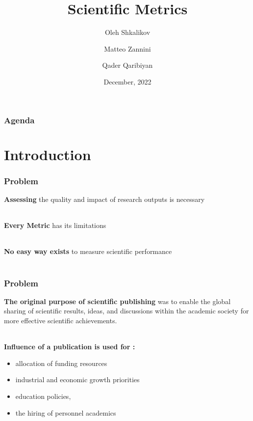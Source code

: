 \documentclass{beamer}
\title[Scientific metrics]{Scientific Metrics}
\author[O. Shkalikov \and M. Zannini \and Q.Qaribiyan]
{Oleh Shkalikov \and Matteo Zannini \and Qader Qaribiyan}
\institute[]{TU Dresden, Computer Science Faculty}
\date{December, 2022}
\begin{document}
\frame{\titlepage}

\begin{frame}
    \frametitle{Agenda}
    \tableofcontents
\end{frame}

\section{Introduction}
\begin{frame}

    \frametitle{Problem}

    \textbf{Assessing} the quality and impact of research outputs is necessary \\~\

    \textbf{Every Metric} has its limitations\\~\

    \textbf{No easy way exists} to measure scientific performance\\~\

\end{frame}
\begin{frame}

    \frametitle{Problem}

    \textbf{The original purpose of scientific publishing} was to enable the global sharing of scientific results, ideas, and discussions within the academic society for more effective scientific achievements.\\~\

    \textbf{Influence of a publication is used for :}

    \begin{itemize}
        \item allocation of funding resources
        \item industrial and economic growth priorities
        \item  education policies,
        \item  the hiring of personnel academics
    \end{itemize}

\end{frame}
\end{document}
